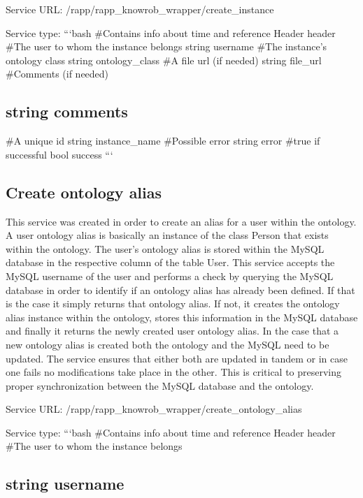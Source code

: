 Service U\-R\-L\-: {\ttfamily /rapp/rapp\-\_\-knowrob\-\_\-wrapper/create\-\_\-instance}

Service type\-: ```bash \#\-Contains info about time and reference Header header \#\-The user to whom the instance belongs string username \#\-The instance’s ontology class string ontology\-\_\-class \#\-A file url (if needed) string file\-\_\-url \#\-Comments (if needed) \subsection*{string comments }

\#\-A unique id string instance\-\_\-name \#\-Possible error string error \#true if successful bool success ```

\subsection*{Create ontology alias}

This service was created in order to create an alias for a user within the ontology. A user ontology alias is basically an instance of the class Person that exists within the ontology. The user’s ontology alias is stored within the My\-S\-Q\-L database in the respective column of the table User. This service accepts the My\-S\-Q\-L username of the user and performs a check by querying the My\-S\-Q\-L database in order to identify if an ontology alias has already been defined. If that is the case it simply returns that ontology alias. If not, it creates the ontology alias instance within the ontology, stores this information in the My\-S\-Q\-L database and finally it returns the newly created user ontology alias. In the case that a new ontology alias is created both the ontology and the My\-S\-Q\-L need to be updated. The service ensures that either both are updated in tandem or in case one fails no modifications take place in the other. This is critical to preserving proper synchronization between the My\-S\-Q\-L database and the ontology.

Service U\-R\-L\-: {\ttfamily /rapp/rapp\-\_\-knowrob\-\_\-wrapper/create\-\_\-ontology\-\_\-alias}

Service type\-: ```bash \#\-Contains info about time and reference Header header \#\-The user to whom the instance belongs \subsection*{string username }

